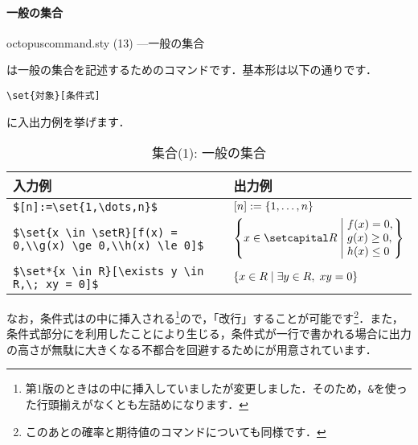 \documentclass[uplatex]{jsreport}
\begin{document}
\paragraph{一般の集合}\hspace{0em}\par
\begin{insertcode}[firstnumber=172]{octopuscommand.sty (13) ---一般の集合}
%
\end{insertcode}
\par
{}は一般の集合を記述するためのコマンドです．基本形は以下の通りです．\par
\begin{octpframegreen2}[title=基本形]
  \verb|\set{対象}[条件式]|
\end{octpframegreen2}
に入出力例を挙げます．\par
\begin{table}[htbp]
  \centering
  \caption{集合(1): 一般の集合}
  \label{table:2.set1}
  \begin{tabular}{ll}\hline
    入力例 & 出力例 \\ \hline
    \verb|$[n]:=\set{1,\dots,n}$| & $[n]:=\set{1,\dots,n}$\\
    \verb|$\set{x \in \setR}[f(x) = 0,\\g(x) \ge 0,\\h(x) \le 0]$| & $\set{x \in \setR}[f(x) = 0,\\g(x) \ge 0,\\h(x) \le 0]$\\
    \verb|$\set*{x \in R}[\exists y \in R,\; xy = 0]$| & $\set*{x \in R}[\exists y \in R,\; xy = 0]$ \\\hline
  \end{tabular}
\end{table}\par
なお，条件式はの中に挿入される\footnote{第1版のときはの中に挿入していましたが変更しました．そのため，\texttt{\&}を使った行頭揃えがなくとも左詰めになります．}ので，「改行」することが可能です\footnote{このあとの確率と期待値のコマンドについても同様です．}．また，条件式部分にを利用したことにより生じる，条件式が一行で書かれる場合に出力の高さが無駄に大きくなる不都合を回避するためにが用意されています．
\par
\end{document}
